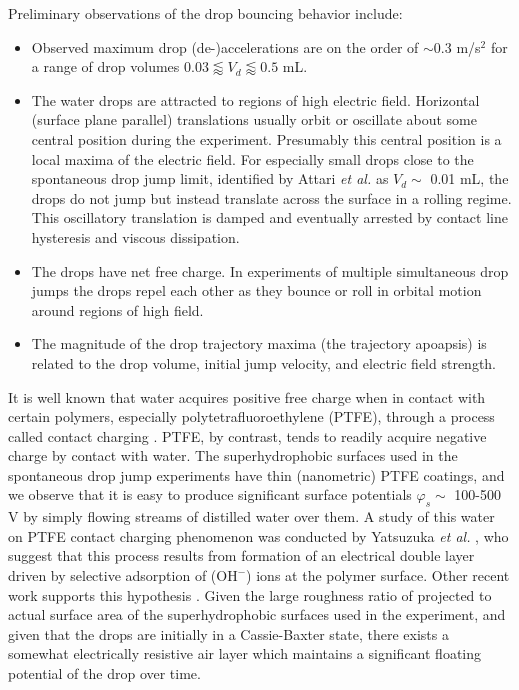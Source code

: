 \documentclass[aip,reprint, floatfix]{revtex4-1}
\begin{document}
Preliminary observations of the drop bouncing behavior include:
\begin{itemize}
\item Observed maximum drop (de-)accelerations are on the order of $\sim$0.3 m/s$^2$ for a range of drop volumes $0.03 \lessapprox V_d \lessapprox 0.5$ mL.
\item The water drops are attracted to regions of high electric field. Horizontal (surface plane parallel) translations usually orbit or oscillate about some central position during the experiment. Presumably this central position is a local maxima of the electric field. For especially small drops close to the spontaneous drop jump limit, identified by Attari \emph{et al.} \citep{attari_puddle_2016} as $V_d \sim$ 0.01 mL, the drops do not jump but instead translate across the surface in a rolling regime. This oscillatory translation is damped and eventually arrested by contact line hysteresis and viscous dissipation.
\item The drops have net free charge. In experiments of multiple simultaneous drop jumps the drops repel each other as they bounce or roll in orbital motion around regions of high field.
\item The magnitude of the drop trajectory maxima (the trajectory apoapsis) is related to the drop volume, initial jump velocity, and electric field strength.
\end{itemize}

It is well known that water acquires positive free charge when in contact with certain polymers, especially polytetrafluoroethylene (PTFE), through a process called contact charging \cite{langmuir_surface_1938}. PTFE, by contrast, tends to readily acquire negative charge by contact with water. The superhydrophobic surfaces used in the spontaneous drop jump experiments have thin (nanometric) PTFE coatings, and we observe that it is easy to produce significant surface potentials $\varphi_s \sim$ 100-500 V by simply flowing streams of distilled water over them. A study of this water on PTFE contact charging phenomenon was conducted by Yatsuzuka \emph{et al.} \cite{yatsuzuka_electrification_1994}, who suggest that this process results from formation of an electrical double layer driven by selective adsorption of ($\mbox{OH}^-$) ions at the polymer surface. Other recent work supports this hypothesis \cite{beattie_intrinsic_2006, strazdaite_water_2015}. Given the large roughness ratio of projected to actual surface area of the superhydrophobic surfaces used in the experiment, and given that the drops are initially in a Cassie-Baxter state, there exists a somewhat electrically resistive air layer which maintains a significant floating potential of the drop over time.
\end{document}

